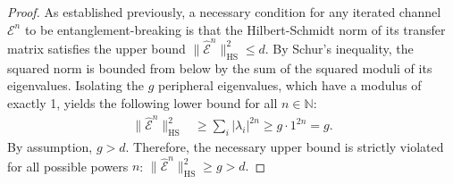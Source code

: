 \begin{proof}
As established previously, a necessary condition for any iterated channel $\mathcal{E}^n$ to be entanglement-breaking is that the Hilbert-Schmidt norm of its transfer matrix satisfies the upper bound $\|\hat{\mathcal{E}}^n\|_{\text{HS}}^2 \le d$. By Schur's inequality, the squared norm is bounded from below by the sum of the squared moduli of its eigenvalues. Isolating the $g$ peripheral eigenvalues, which have a modulus of exactly 1, yields the following lower bound for all $n \in \mathbb{N}$:
\begin{align*}
    \|\hat{\mathcal{E}}^n\|_{\text{HS}}^2 &\ge \sum_i |\lambda_i|^{2n} \ge g \cdot 1^{2n} = g.
\end{align*}
By assumption, $g > d$. Therefore, the necessary upper bound is strictly violated for all possible powers $n$: $\|\hat{\mathcal{E}}^n\|_{\text{HS}}^2 \ge g > d.$
\end{proof}







